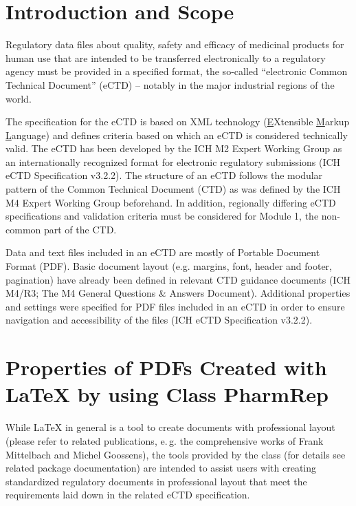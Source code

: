 \newcommand{\pkg}[1]{\textsf{#1}}
\newcommand{\prog}[1]{{#1}}
\newcommand{\env}[1]{\texttt{#1}}

\newcommand{\eg}{e.\,g.\xspace}
\makeatother



\section{Introduction and Scope}
Regulatory data files about quality, safety and efficacy of medicinal products for human use that are intended to be transferred electronically to a regulatory agency must be provided in a specified format, the so-called \enquote{electronic Common Technical Document} (eCTD) -- notably in the major industrial regions of the world.

The specification for the eCTD is based on XML technology (\underline{E}Xtensible \underline{M}arkup \underline{L}anguage) and defines criteria based on which an eCTD is considered technically valid. The eCTD has been developed by the ICH M2 Expert Working Group  as an internationally recognized format for electronic regulatory submissions (ICH eCTD Specification v3.2.2). The structure of an eCTD follows the modular pattern of the Common Technical Document (CTD) as was defined by the ICH M4 Expert Working Group beforehand. In addition, regionally differing eCTD specifications and validation criteria must be considered for Module 1, the non-common part of the CTD.

Data and text files included in an eCTD are mostly of Portable Document Format (PDF). Basic document layout (e.g. margins, font, header and footer, pagination) have already been defined in relevant CTD guidance documents (ICH M4/R3; The M4 General Questions \& Answers Document). Additional properties and settings were specified for PDF files included in an eCTD  in order to ensure navigation and accessibility of the files (ICH eCTD Specification v3.2.2).

\section{Properties of PDFs Created with \LaTeX{} by using Class PharmRep}
While \LaTeX{} in general is a tool to create documents with professional layout (please refer to related publications, \eg the comprehensive works of Frank Mittelbach and Michel Goossens), the tools provided by the class \PharmRep (for details see related package documentation) are intended to assist users with creating standardized regulatory documents in professional layout that meet the requirements laid down in the related eCTD specification.


